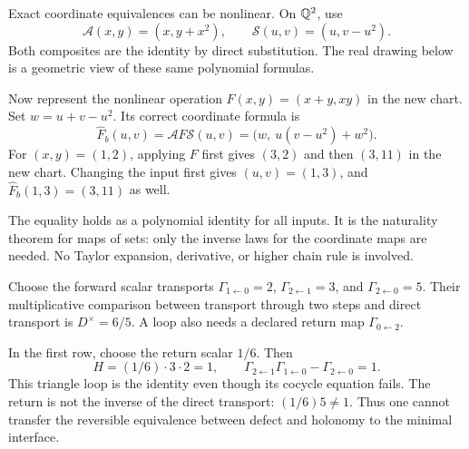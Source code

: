 Exact coordinate equivalences can be nonlinear. On $\mathbb Q^2$, use
\[
\mathcal A(x,y)=(x,y+x^2),\qquad
\mathcal S(u,v)=(u,v-u^2).
\]
Both composites are the identity by direct substitution. The real drawing below is a geometric view of these same polynomial formulas.


Now represent the nonlinear operation $F(x,y)=(x+y,xy)$ in the new chart. Set $w=u+v-u^2$. Its correct coordinate formula is
\[
\widehat F_b(u,v)=\mathcal A F\mathcal S(u,v)
=\bigl(w,\ u(v-u^2)+w^2\bigr).
\]
For $(x,y)=(1,2)$, applying $F$ first gives $(3,2)$ and then $(3,11)$ in the new chart. Changing the input first gives $(u,v)=(1,3)$, and $\widehat F_b(1,3)=(3,11)$ as well.

The equality holds as a polynomial identity for all inputs. It is the naturality theorem for maps of sets: only the inverse laws for the coordinate maps are needed. No Taylor expansion, derivative, or higher chain rule is involved.


Choose the forward scalar transports $\Gamma_{1\leftarrow0}=2$, $\Gamma_{2\leftarrow1}=3$, and $\Gamma_{2\leftarrow0}=5$. Their multiplicative comparison between transport through two steps and direct transport is $D^\times=6/5$. A loop also needs a declared return map $\Gamma_{0\leftarrow2}$.


In the first row, choose the return scalar $1/6$. Then
\[
H=(1/6)\cdot3\cdot2=1,
\qquad \Gamma_{2\leftarrow1}\Gamma_{1\leftarrow0}-\Gamma_{2\leftarrow0}=1.
\]
This triangle loop is the identity even though its cocycle equation fails. The return is not the inverse of the direct transport: $(1/6)5\ne1$. Thus one cannot transfer the reversible equivalence between defect and holonomy to the minimal interface.

